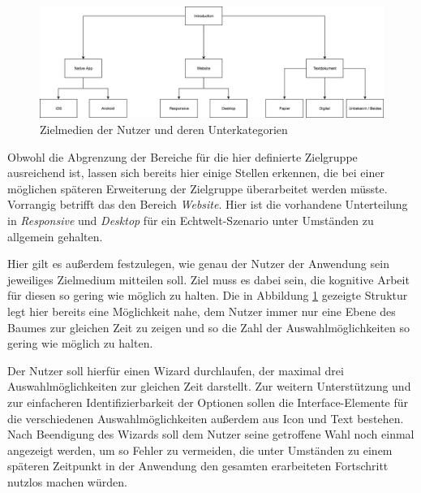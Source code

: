 \begin{figure}[h]
    \centering
    \includegraphics[width=1\textwidth]{images/ablauf_intro.png}
    \caption{Zielmedien der Nutzer und deren Unterkategorien}
    \label{fig:intro}
\end{figure}

Obwohl die Abgrenzung der Bereiche für die hier definierte Zielgruppe ausreichend ist, lassen sich bereits hier einige Stellen erkennen, die bei einer möglichen späteren Erweiterung der Zielgruppe überarbeitet werden müsste. Vorrangig betrifft das den Bereich \textit{Website}. Hier ist die vorhandene Unterteilung in \textit{Responsive} und \textit{Desktop} für ein Echtwelt-Szenario unter Umständen zu allgemein gehalten.

Hier gilt es außerdem festzulegen, wie genau der Nutzer der Anwendung sein jeweiliges Zielmedium mitteilen soll. Ziel muss es dabei sein, die kognitive Arbeit\footnotemark{} für diesen so gering wie möglich zu halten. Die in Abbildung \ref{fig:intro} gezeigte Struktur legt hier bereits eine Möglichkeit nahe, dem Nutzer immer nur eine Ebene des Baumes zur gleichen Zeit zu zeigen und so die Zahl der Auswahlmöglichkeiten so gering wie möglich zu halten.\\


Der Nutzer soll hierfür einen Wizard\footnotemark{} durchlaufen, der maximal drei Auswahlmöglichkeiten zur gleichen Zeit darstellt. Zur weitern Unterstützung und zur einfacheren Identifizierbarkeit der Optionen sollen die Interface-Elemente für die verschiedenen Auswahlmöglichkeiten außerdem aus Icon und Text bestehen.
Nach Beendigung des Wizards soll dem Nutzer seine getroffene Wahl noch einmal angezeigt werden, um so Fehler zu vermeiden, die unter Umständen zu einem späteren Zeitpunkt in der Anwendung den gesamten erarbeiteten Fortschritt nutzlos machen würden.

